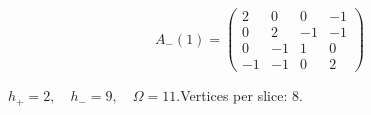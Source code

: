 \begin{minipage}{\linewidth}
\begin{minipage}[c]{0.495\linewidth}
\end{minipage}%
\begin{minipage}[c]{0.495\linewidth}\centering\fontsize{9.7}{12}\selectfont
\setlength{\abovedisplayskip}{4pt}\setlength{\belowdisplayskip}{4pt}
\setlength{\abovedisplayshortskip}{4pt}\setlength{\belowdisplayshortskip}{4pt}
\setlength{\arraycolsep}{3pt}\renewcommand{\arraystretch}{1.08}
\[A_{-}(1)=\begin{pmatrix}2 & 0 & 0 & -1\\0 & 2 & -1 & -1\\0 & -1 & 1 & 0\\-1 & -1 & 0 & 2\end{pmatrix}\]
\end{minipage}%
\par\smallskip\noindent\small $h_+=2,\quad h_-=9,\quad \Omega=11.$\quad Vertices per slice: 8.
\end{minipage}\par\vfill
